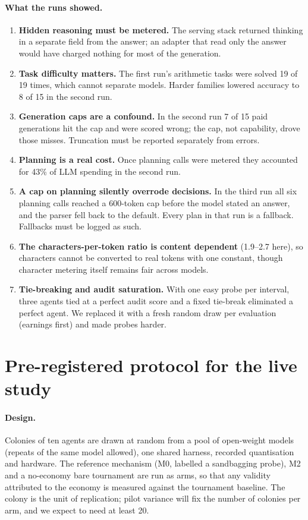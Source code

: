 \documentclass[11pt]{article}
\theoremstyle{plain}
\theoremstyle{remark}
\begin{document}
\paragraph{What the runs showed.}
\begin{enumerate}[label=(\alph*)]
  \item \textbf{Hidden reasoning must be metered.} The serving stack returned thinking in a separate field from the answer; an adapter that read only the answer would have charged nothing for most of the generation.
  \item \textbf{Task difficulty matters.} The first run's arithmetic tasks were solved 19 of 19 times, which cannot separate models. Harder families lowered accuracy to 8 of 15 in the second run.
  \item \textbf{Generation caps are a confound.} In the second run 7 of 15 paid generations hit the cap and were scored wrong; the cap, not capability, drove those misses. Truncation must be reported separately from errors.
  \item \textbf{Planning is a real cost.} Once planning calls were metered they accounted for 43\% of LLM spending in the second run.
  \item \textbf{A cap on planning silently overrode decisions.} In the third run all six planning calls reached a 600-token cap before the model stated an answer, and the parser fell back to the default. Every plan in that run is a fallback. Fallbacks must be logged as such.
  \item \textbf{The characters-per-token ratio is content dependent} (1.9--2.7 here), so characters cannot be converted to real tokens with one constant, though character metering itself remains fair across models.
  \item \textbf{Tie-breaking and audit saturation.} With one easy probe per interval, three agents tied at a perfect audit score and a fixed tie-break eliminated a perfect agent. We replaced it with a fresh random draw per evaluation (earnings first) and made probes harder.
\end{enumerate}

\section{Pre-registered protocol for the live study}
\label{sec:protocol}

\paragraph{Design.}
Colonies of ten agents are drawn at random from a pool of open-weight models (repeats of the same model allowed), one shared harness, recorded quantisation and hardware. The reference mechanism (M0, labelled a sandbagging probe), M2 and a no-economy bare tournament are run as arms, so that any validity attributed to the economy is measured against the tournament baseline. The colony is the unit of replication; pilot variance will fix the number of colonies per arm, and we expect to need at least 20.
\end{document}
